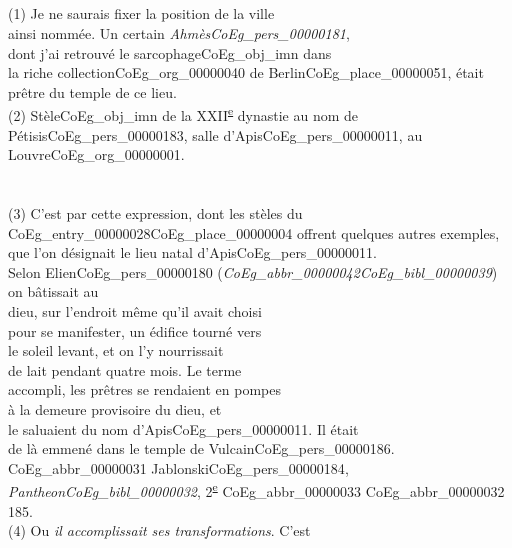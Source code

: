 \documentclass{book}
\begin{document}
{\begin{paracol}{2}
\noindent \\
\\
\\
\\
(1) Je ne saurais fixer la position de la ville\\
ainsi nommée. Un certain \textit{Ahmès\gls{CoEg_pers_00000181}},\\
dont j’ai retrouvé le sarcophage\gls{CoEg_obj_imn} dans\\
la riche collection\gls{CoEg_org_00000040} de Berlin\gls{CoEg_place_00000051}, était\\
prêtre du temple de ce lieu.\\
(2) Stèle\gls{CoEg_obj_imn} de la XXII\textsuperscript{\underline{e}} dynastie au nom de\\
Pétisis\gls{CoEg_pers_00000183}, salle d’Apis\gls{CoEg_pers_00000011}, au Louvre\gls{CoEg_org_00000001}.\\
\\
\\
(3) C’est par cette expression, dont les stèles du\\
\Gls{CoEg_entry_00000028}\gls{CoEg_place_00000004} offrent quelques autres exemples,\\
que l’on désignait le lieu natal d’Apis\gls{CoEg_pers_00000011}.\\
Selon Elien\gls{CoEg_pers_00000180} (\textit{\gls{CoEg_abbr_00000042}\gls{CoEg_bibl_00000039}}) on bâtissait au\\
dieu, sur l’endroit même qu’il avait choisi\\
pour se manifester, un édifice tourné vers\\
le soleil levant, et on l’y nourrissait\\
de lait pendant quatre mois. Le terme\\
accompli, les prêtres se rendaient en pompes\\
à la demeure provisoire du dieu, et\\
le saluaient du nom d’Apis\gls{CoEg_pers_00000011}. Il était\\
de là emmené dans le temple de Vulcain\gls{CoEg_pers_00000186}.\\
\Gls{CoEg_abbr_00000031} Jablonski\gls{CoEg_pers_00000184}, \textit{Pantheon\gls{CoEg_bibl_00000032}}, 2\textsuperscript{\underline{e}} \gls{CoEg_abbr_00000033} \gls{CoEg_abbr_00000032} 185.\\
(4) Ou \textit{il accomplissait ses transformations}. C’est\\

\end{paracol}}
\end{document}
